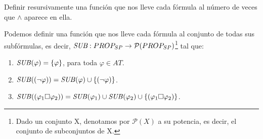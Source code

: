 \begin{ex} Definir resursivamente una función que nos lleve cada fórmula al número de veces que $\land$ aparece en ella. 
\end{ex}

\begin{example} Podemos definir una función que nos lleve cada fórmula al conjunto de todas sus subfórmulas, es decir,  $\text{\textit{\text{\textit{SUB}}}}: PROP_{SP} \rightarrow \mathcal{P} (PROP_{SP})$\footnote{Dado un conjunto X, denotamos por $\mathcal{P}(X)$ a su potencia, es decir, el conjunto de subconjuntos de X.} tal que:
\begin{enumerate}
    \item $\text{\textit{SUB}}(\varphi) = \{\varphi\}$, para toda $\varphi \in AT$.
    \item $\text{\textit{SUB}}((\neg \varphi)) = \text{\textit{SUB}}(\varphi) \cup \{(\neg \varphi)\}$.
    \item $\text{\textit{SUB}}((\varphi_1 \square \varphi_2)) = \text{\textit{SUB}}(\varphi_1) \cup \text{\textit{SUB}}(\varphi_2) \cup \{(\varphi_1 \square \varphi_2)\}$.
\end{enumerate}
\end{example} 

